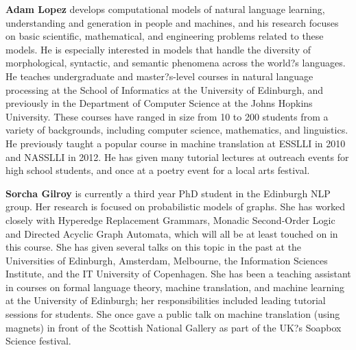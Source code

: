 \begin{bio}

\textbf{Adam Lopez} develops computational models of natural language learning, understanding and generation
in people and machines, and his research focuses on basic scientific, mathematical, and
engineering problems related to these models. He is especially interested in models that handle
the diversity of morphological, syntactic, and semantic phenomena across the world?s languages.
He teaches undergraduate and master?s-level courses in natural language processing at the School
of Informatics at the University of Edinburgh, and previously in the Department of Computer
Science at the Johns Hopkins University. These courses have ranged in size from 10 to 200 students
from a variety of backgrounds, including computer science, mathematics, and linguistics. He
previously taught a popular course in machine translation at ESSLLI in 2010 and NASSLLI in
2012. He has given many tutorial lectures at outreach events for high school students, and once at
a poetry event for a local arts festival.

\textbf{Sorcha Gilroy} is currently a third year PhD student in the Edinburgh NLP group. Her research is
focused on probabilistic models of graphs. She has worked closely with Hyperedge Replacement
Grammars, Monadic Second-Order Logic and Directed Acyclic Graph Automata, which will all
be at least touched on in this course. She has given several talks on this topic in the past at the
Universities of Edinburgh, Amsterdam, Melbourne, the Information Sciences Institute, and the IT
University of Copenhagen. She has been a teaching assistant in courses on formal language theory,
machine translation, and machine learning at the University of Edinburgh; her responsibilities
included leading tutorial sessions for students. She once gave a public talk on machine translation
(using magnets) in front of the Scottish National Gallery as part of the UK?s Soapbox Science
festival.

\end{bio}

